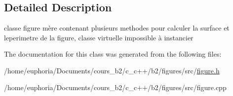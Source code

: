 \subsection{Detailed Description}
classe figure mère contenant plusieurs methodes pour calculer la surface et leperimetre de la figure, classe virtuelle impossible à instancier 

The documentation for this class was generated from the following files\+:\begin{DoxyCompactItemize}
\item 
/home/euphoria/\+Documents/cours\+\_\+b2/c\+\_\+c++/b2/figures/src/\hyperlink{figure_8h}{figure.\+h}\item 
/home/euphoria/\+Documents/cours\+\_\+b2/c\+\_\+c++/b2/figures/src/figure.\+cpp\end{DoxyCompactItemize}
